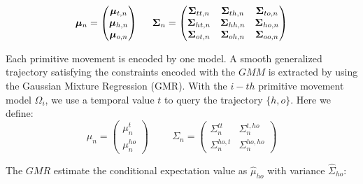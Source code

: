 \begin{equation}
{
\boldsymbol{\mu}_n = \begin{pmatrix}    \boldsymbol{\mu}_{t,n}     \\
                                        \boldsymbol{\mu}_{h,n}          \\
                                        \boldsymbol{\mu}_{o,n}
                    \end{pmatrix}
\hspace{0.2in}
\boldsymbol{\Sigma}_n = \begin{pmatrix}     \boldsymbol{\Sigma}_{tt,n}  & \boldsymbol{\Sigma}_{th,n} & \boldsymbol{\Sigma}_{to,n}  \\
                                            \boldsymbol{\Sigma}_{ht,n}  & \boldsymbol{\Sigma}_{hh,n}  & \boldsymbol{\Sigma}_{ho,n} \\
                                            \boldsymbol{\Sigma}_{ot,n}   & \boldsymbol{\Sigma}_{oh,n}   & \boldsymbol{\Sigma}_{oo,n}
                        \end{pmatrix}
}
\end{equation}

Each primitive movement is encoded by one model. A smooth generalized trajectory satisfying the constraints encoded with the $GMM$ is extracted by using the Gaussian Mixture Regression (GMR). With the $i-th$ primitive movement model $\Omega_i$, we use a temporal value $t$ to query the trajectory $\{h, o\}$. Here we define:
\begin{equation}
{
 {\mu}_{n} = \begin{pmatrix} {\mu}_{n}^t    \\
                             {\mu}_{n}^{ho}
             \end{pmatrix}
}
\hspace{1cm}
{
{\Sigma}_{n} =  \begin{pmatrix} {\Sigma}_{n}^{tt}  & {\Sigma}_{n}^{t,ho}  \\
                                {\Sigma}_{n}^{ho,t} & {\Sigma}_{n}^{ho,ho}
                \end{pmatrix}
}
\end{equation}

The $GMR$ estimate the conditional expectation value as $\hat{\mu}_{ho}$ with variance $\hat{\Sigma}_{ho}$:

